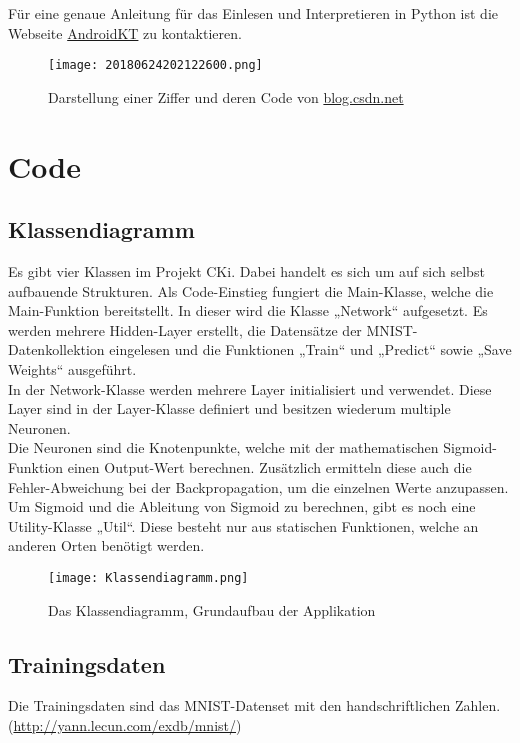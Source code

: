 Für eine genaue Anleitung für das Einlesen und Interpretieren in Python ist die Webseite \href{https://androidkt.com/extract-images-from-mnist-idx3-ubyte-file-format-in-python/}{AndroidKT} zu kontaktieren.

\begin{figure}[H]
	\centering
	\texttt{[image: 20180624202122600.png]}
	\caption{Darstellung einer Ziffer und deren Code von \href{https://blog.csdn.net/qq_41185868/article/details/79094752}{blog.csdn.net}}
	\label{fig:designubytecomp}
\end{figure}



\section{Code}
\label{sec:DesignCode}
\subsection{Klassendiagramm}
\label{sec:DesignKlassendiagramm}
Es gibt vier Klassen im Projekt CKi. Dabei handelt es sich um auf sich selbst aufbauende Strukturen. Als Code-Einstieg fungiert die Main-Klasse, welche die Main-Funktion bereitstellt. In dieser wird die Klasse „Network“ aufgesetzt. Es werden mehrere Hidden-Layer erstellt, die Datensätze der MNIST-Datenkollektion eingelesen und die Funktionen „Train“ und „Predict“ sowie „Save Weights“ ausgeführt. 
\\
In der Network-Klasse werden mehrere Layer initialisiert und verwendet. Diese Layer sind in der Layer-Klasse definiert und besitzen wiederum multiple Neuronen.
\\
Die Neuronen sind die Knotenpunkte, welche mit der mathematischen Sigmoid-Funktion einen Output-Wert berechnen. Zusätzlich ermitteln diese auch die Fehler-Abweichung bei der Backpropagation, um die einzelnen Werte anzupassen.
\\
Um Sigmoid und die Ableitung von Sigmoid zu berechnen, gibt es noch eine Utility-Klasse „Util“. Diese besteht nur aus statischen Funktionen, welche an anderen Orten benötigt werden.


\begin{figure}[H]
	\centering
	\texttt{[image: Klassendiagramm.png]}
	\caption{Das Klassendiagramm, Grundaufbau der Applikation}
	\label{fig:designklassendiagramm}
\end{figure}

\subsection{Trainingsdaten}
\label{sec:DesignTrainingsdaten}
Die Trainingsdaten sind das MNIST-Datenset mit den handschriftlichen Zahlen. (\url{http://yann.lecun.com/exdb/mnist/})

